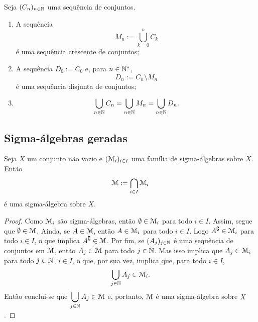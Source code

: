 \begin{proposition}
Seja $(C_n)_{n \in \mathbb{N}}$ uma sequência de conjuntos.
	\begin{enumerate}
	\item A sequência
	\begin{equation*}
	M_n := \bigcup_{k=0}^n C_k
	\end{equation*}
é uma sequência crescente de conjuntos;
	\item A sequência $D_0 := C_0$ e, para $n \in \mathbb{N}^*$,
	\begin{equation*}
	D_n := C_n \setminus M_n
	\end{equation*}
é uma sequência disjunta de conjuntos;
	\item	
	\begin{equation*}
	\bigcup_{n \in \mathbb{N}} C_n = \bigcup_{n \in \mathbb{N}} M_n = \bigcup_{n \in \mathbb{N}} D_n.
	\end{equation*}
	\end{enumerate}
\end{proposition}

\subsection{Sigma-álgebras geradas}

\begin{proposition}
Seja $X$ um conjunto não vazio e $(\mathcal{M}_i)_{i \in I}$ uma família de sigma-álgebras sobre $X$. Então
	\begin{equation*}
	\mathcal{M} := \bigcap_{i \in I} \mathcal{M}_i
	\end{equation*}
é uma sigma-álgebra sobre $X$.
\end{proposition}
\begin{proof}
	Como $\mathcal{M}_i$ são sigma-álgebras, então $\emptyset \in \mathcal{M}_i$ para todo $i \in I$. Assim, segue que $\emptyset \in \mathcal{M}$. Ainda, se $A \in \mathcal{M}$, então $A \in \mathcal{M}_i$ para todo $i \in I$. Logo $A^\complement \in \mathcal{M}_i$ para todo $i \in I$, o que implica $A^\complement \in \mathcal{M}$. Por fim, se $(A_j)_{j \in \mathbb{N}}$ é uma sequência de conjuntos em $\mathcal{M}$, então $A_j \in \mathcal{M}$ para todo $j \in \mathbb{N}$. Mas isso implica que $A_j \in \mathcal{M}_i$ para todo $j \in \mathbb{N}$, $i \in I$, o que, por sua vez, implica que, para todo $i \in I$,
	\begin{equation*}
	\bigcup_{j \in \mathbb{N}} A_j \in \mathcal{M}_i.
	\end{equation*}
Então conclui-se que $\displaystyle\bigcup_{j \in \mathbb{N}} A_j \in \mathcal{M}$ e, portanto, $\mathcal{M}$ é uma sigma-álgebra sobre $X$.
\end{proof}

